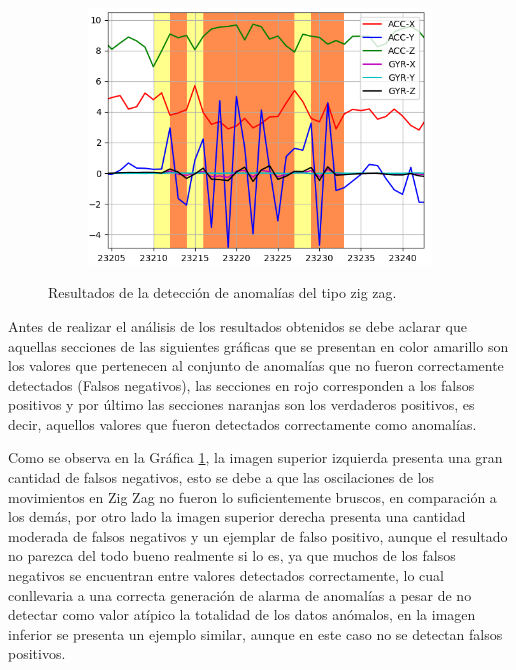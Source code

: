 \begin{figure}[H]
{\begin{varwidth}{\textwidth}
\begin{subfigure}[h]{0.45\textwidth}
            \includegraphics[width=\textwidth]{imagenes/Cap5/zig_zag3}
        \end{subfigure} 
        \end{varwidth}}
        \caption{Resultados de la detecci\'{o}n de anomal\'{i}as del tipo zig zag.}
		\label{fig:resultados_zigzag}
    \end{figure}
    
Antes de realizar el an\'{a}lisis de los resultados obtenidos se debe aclarar que aquellas secciones de las siguientes gr\'{a}ficas que se presentan en color amarillo son los valores que pertenecen al conjunto de anomal\'{i}as que no fueron correctamente detectados (Falsos negativos), las secciones en rojo corresponden a los falsos positivos y por \'{u}ltimo las secciones naranjas son los verdaderos positivos, es decir, aquellos valores que fueron detectados correctamente como anomal\'{i}as.

\vspace{5mm} %

Como se observa en la Gr\'{a}fica \ref{fig:resultados_zigzag}, la imagen superior izquierda presenta una gran cantidad de falsos negativos, esto se debe a que las oscilaciones de los movimientos en Zig Zag no fueron lo suficientemente bruscos, en comparaci\'{o}n a los dem\'{a}s, por otro lado la imagen superior derecha presenta una cantidad moderada de falsos negativos y un ejemplar de falso positivo, aunque el resultado no parezca del todo bueno realmente si lo es, ya que muchos de los falsos negativos se encuentran entre valores detectados correctamente, lo cual conllevaria a una correcta generaci\'{o}n de alarma de anomal\'{i}as a pesar de no detectar como valor at\'{i}pico la totalidad de los datos an\'{o}malos, en la imagen inferior se presenta un ejemplo similar, aunque en este caso no se detectan falsos positivos.

